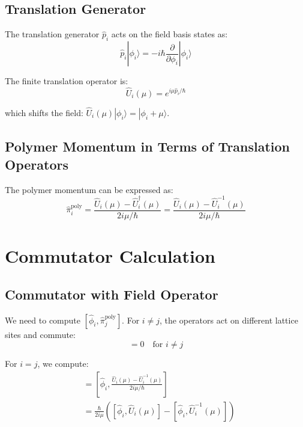 \documentclass[12pt]{article}
\begin{document}
\subsection{Translation Generator}

The translation generator $\hat{p}_i$ acts on the field basis states as:
\begin{equation}
\hat{p}_i |\phi_i\rangle = -i\hbar \frac{\partial}{\partial \phi_i} |\phi_i\rangle
\end{equation}

The finite translation operator is:
\begin{equation}
\hat{U}_i(\mu) = e^{i\mu \hat{p}_i/\hbar}
\end{equation}

which shifts the field: $\hat{U}_i(\mu) |\phi_i\rangle = |\phi_i + \mu\rangle$.

\subsection{Polymer Momentum in Terms of Translation Operators}

The polymer momentum can be expressed as:
\begin{equation}
\hat{\pi}_i^{\text{poly}} = \frac{\hat{U}_i(\mu) - \hat{U}_i^\dagger(\mu)}{2i\mu/\hbar} = \frac{\hat{U}_i(\mu) - \hat{U}_i^{-1}(\mu)}{2i\mu/\hbar}
\end{equation}

\section{Commutator Calculation}

\subsection{Commutator with Field Operator}

We need to compute $[\hat{\phi}_i, \hat{\pi}_j^{\text{poly}}]$. For $i \neq j$, the operators act on different lattice sites and commute:
\begin{equation}
[\hat{\phi}_i, \hat{\pi}_j^{\text{poly}}] = 0 \quad \text{for } i \neq j
\end{equation}

For $i = j$, we compute:
\begin{align}
[\hat{\phi}_i, \hat{\pi}_i^{\text{poly}}] &= \left[\hat{\phi}_i, \frac{\hat{U}_i(\mu) - \hat{U}_i^{-1}(\mu)}{2i\mu/\hbar}\right] \\
&= \frac{\hbar}{2i\mu} \left([\hat{\phi}_i, \hat{U}_i(\mu)] - [\hat{\phi}_i, \hat{U}_i^{-1}(\mu)]\right)
\end{align}
\end{document}
